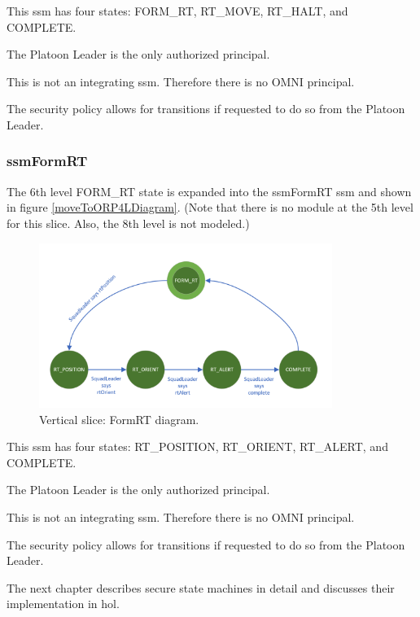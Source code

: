 \documentclass[../../main/main.tex]{subfiles}
\begin{document}
This \gls{ssm} has four states: FORM_RT, RT_MOVE, RT_HALT, and COMPLETE.  

The Platoon Leader is the only authorized principal.

This is not an integrating \gls{ssm}.  Therefore there is no OMNI principal.  

The security policy allows for transitions if requested to do so from the Platoon Leader.

\clearpage

\subsubsection{ssmFormRT}\label{sssec:ssmFormRT}
The 6th level FORM_RT state is expanded into the ssmFormRT \gls{ssm} and shown in figure \ref{moveToORP4LDiagram}.  (Note that there is no module at the 5th level for this slice.  Also, the 8th level is not modeled.)

\begin{figure}[h!]
\centering
\includegraphics[width=0.85\textwidth]{../figures/ssmFormRTDiagram}
\caption{\label{ssmFormRTDiagram} Vertical slice: FormRT diagram.}
\end{figure}

This \gls{ssm} has four states: RT_POSITION, RT_ORIENT, RT_ALERT, and COMPLETE.  

The Platoon Leader is the only authorized principal.

This is not an integrating \gls{ssm}.  Therefore there is no OMNI principal.  

The security policy allows for transitions if requested to do so from the Platoon Leader.

The next chapter describes secure state machines in detail and discusses their implementation in \gls{hol}.
\end{document}
